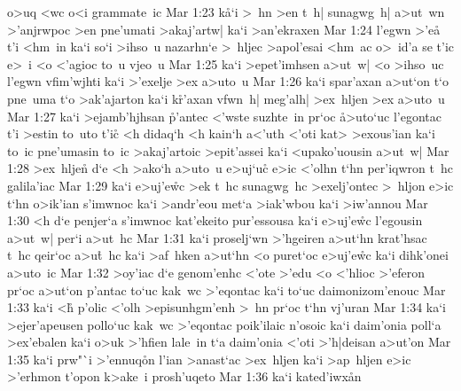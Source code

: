 o>uq
<wc
o<i
grammate~ic\bibvsend
\vs Mar 1:23
k\r{a}`i
>~hn
>en
t~h|
sunagwg~h|
a>ut~wn
>'anjrwpoc
>en
pne'umati
>akaj'artw|
ka`i
>an'ekraxen\bibvsend
\vs Mar 1:24
l'egwn
>'e\r{a}
t'i
<hm~in
ka`i
so`i
>ihso~u
nazarhn`e
>~hljec
>apol'esai
<hm~ac
o>~id'a
se
t'ic
e>~i
<o
<'agioc
to~u
vjeo~u\bibvsend
\vs Mar 1:25
ka`i
>epet'imhsen
a>ut~w|
<o
>ihso~uc
l'egwn
vfim'wjhti
ka`i
>'exelje
>ex
a>uto~u\bibvsend
\vs Mar 1:26
ka`i
spar'axan
a>ut`on
t`o
pne~uma
t`o
>ak'ajarton
ka`i
k\r{r}'axan
vfwn~h|
meg'alh|
>ex~hljen
>ex
a>uto~u\bibvsend
\vs Mar 1:27
ka`i
>ejamb'hjhsan
\r{p}'antec
<'wste
suzhte~in
pr`oc
\r{a}>uto`uc
l'egontac
t'i
>estin
to~uto
t'ic\r{}
<h
didaq`h
<h
kain`h
a<'uth
<'oti
kat>
>exous'ian
ka`i
to~ic
pne'umasin
to~ic
>akaj'artoic
>epit'assei
ka`i
<upako'uousin
a>ut~w|\bibvsend
\vs Mar 1:28
>ex~hljen\r{}
d`e
<h
>ako`h
a>uto~u
e>uj`u\r{c}
e>ic
<'olhn
t`hn
per'iqwron
t~hc
galila'iac\bibvsend
\vs Mar 1:29
ka`i
e>uj'e\r{w}c
>ek
t~hc
sunagwg~hc
>exelj'ontec
>~hljon
e>ic
t`hn
o>ik'ian
s'imwnoc
ka`i
>andr'eou
met`a
>iak'wbou
ka`i
>iw'annou\bibvsend
\vs Mar 1:30
<h
d`e
penjer`a
s'imwnoc
kat'ekeito
pur'essousa
ka`i
e>uj'e\r{w}c
l'egousin
a>ut~w|
per`i
a>ut~hc\bibvsend
\vs Mar 1:31
ka`i
proselj`wn
>'hgeiren
a>ut`hn
krat'hsac
t~hc
qeir`oc
a>u\r{t}~hc
ka`i
>af~hken
a>ut`hn
<o
puret`oc
e>uj'e\r{w}c
ka`i
dihk'onei
a>uto~ic\bibvsend
\vs Mar 1:32
>oy'iac
d`e
genom'enhc
<'ote
>'edu
<o
<'hlioc
>'eferon
pr`oc
a>ut`on
p'antac
to`uc
kak~wc
>'eqontac
ka`i
to`uc
daimonizom'enouc\bibvsend
\vs Mar 1:33
ka`i
<h\r{}
p'olic
<'olh
>episunhgm'enh
>~hn
pr`oc
t`hn
vj'uran\bibvsend
\vs Mar 1:34
ka`i
>ejer'apeusen
pollo`uc
kak~wc
>'eqontac
poik'ilaic
n'osoic
ka`i
daim'onia
poll`a
>ex'ebalen
ka`i
o>uk
>'hfien
lale~in
t`a
daim'onia
<'oti
>'h|deisan
a>ut'on\bibvsend
\vs Mar 1:35
ka`i
prw"`i
>'ennuq\r{o}n
l'ian
>anast`ac
>ex~hljen
ka`i
>ap~hljen
e>ic
>'erhmon
t'opon
k>ake~i
prosh'uqeto\bibvsend
\vs Mar 1:36
ka`i
kated'iwx\r{a}n
